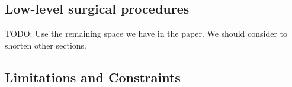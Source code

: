 \subsection{Low-level surgical procedures}

TODO: Use the remaining space we have in the paper. We should consider to shorten other sections.

\subsection{Limitations and Constraints}



